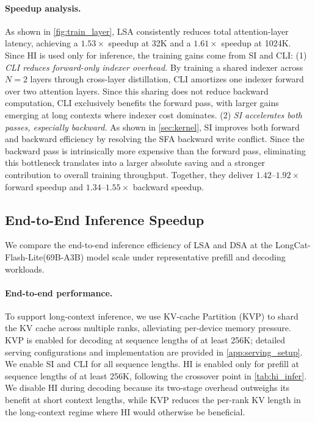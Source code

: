 \documentclass{article}
\newcommand{\longcat}{LongCat-Flash-Lite\xspace}
\begin{document}
\paragraph{Speedup analysis.}
As shown in \cref{fig:train_layer}, LSA consistently reduces total attention-layer latency, achieving a $1.53\times$ speedup at 32K and a $1.61\times$ speedup at 1024K. Since HI is used only for inference, the training gains come from SI and CLI:
(1) \emph{CLI reduces forward-only indexer overhead.} By training a shared indexer across $N=2$ layers through cross-layer distillation, CLI amortizes one indexer forward over two attention layers. Since this sharing does not reduce backward computation, CLI exclusively benefits the forward pass, with larger gains emerging at long contexts where indexer cost dominates.
(2) \emph{SI accelerates both passes, especially backward.} As shown in \cref{sec:kernel}, SI improves both forward and backward efficiency by resolving the SFA backward write conflict. Since the backward pass is intrinsically more expensive than the forward pass, eliminating this bottleneck translates into a larger absolute saving and a stronger contribution to overall training throughput.
Together, they deliver $1.42$--$1.92\times$ forward speedup and $1.34$--$1.55\times$ backward speedup.


\subsection{End-to-End Inference Speedup}
\label{sec:inference_speedup}

We compare the end-to-end inference efficiency of LSA and DSA at the \longcat (69B-A3B) model scale under representative prefill and decoding workloads.

\paragraph{End-to-end performance.}
To support long-context inference, we use KV-cache Partition (KVP) to shard the KV cache across multiple ranks, alleviating per-device memory pressure. KVP is enabled for decoding at sequence lengths of at least 256K; detailed serving configurations and implementation are provided in \cref{app:serving_setup}.
We enable SI and CLI for all sequence lengths. HI is enabled only for prefill at sequence lengths of at least 256K, following the crossover point in \cref{tab:hi_infer}. We disable HI during decoding because its two-stage overhead outweighs its benefit at short context lengths, while KVP reduces the per-rank KV length in the long-context regime where HI would otherwise be beneficial.
\end{document}
